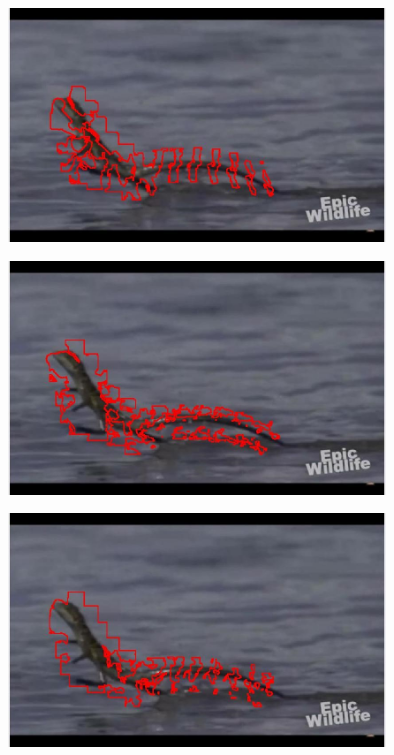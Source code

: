 \documentclass{article}
\begin{document}
	\begin{center}
		\includegraphics[width=100mm]{img/e4}
	\end{center}
	
	\begin{center}
		\includegraphics[width=100mm]{img/e5}
	\end{center}
	
	\begin{center}
		\includegraphics[width=100mm]{img/e6}
	\end{center}
	
\end{document}
